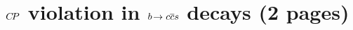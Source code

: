 
\section{\texorpdfstring{$\CP$}{CP} violation in \texorpdfstring{$\bToccbars$}{bToccbars} decays (2 pages)}
\label{sec:cpviolation:btoccbars}